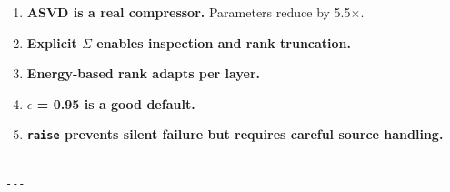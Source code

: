 \begin{enumerate}
\item \textbf{ASVD is a real compressor.} Parameters reduce by 5.5$\times$.
\item \textbf{Explicit $\Sigma$ enables inspection and rank truncation.}
\item \textbf{Energy-based rank adapts per layer.}
\item \textbf{$\epsilon$ = 0.95 is a good default.}
\item \textbf{\texttt{raise} prevents silent failure but requires careful source handling.}
\end{enumerate}
\begin{lstlisting}

---
\end{lstlisting}